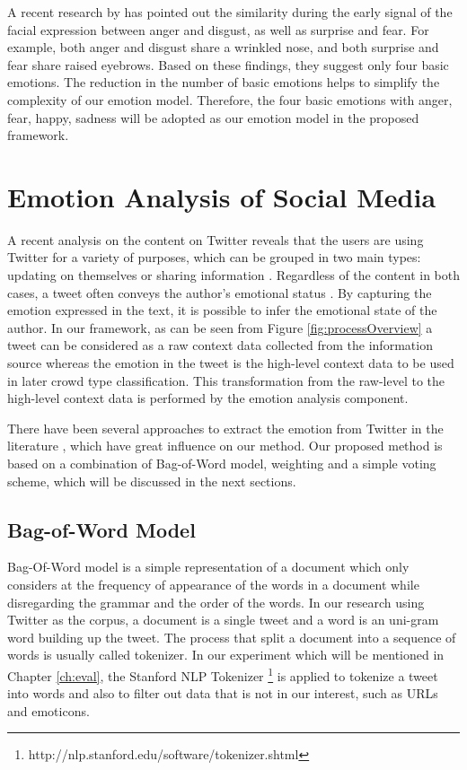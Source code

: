 A recent research by \cite{Jack2014} has pointed out the similarity during the early signal of the facial expression between anger and disgust, as well as surprise and fear. For example, both anger and disgust share a wrinkled nose, and both surprise and fear share raised eyebrows. Based on these findings, they suggest only four basic emotions. The reduction in the number of basic emotions helps to simplify the complexity of our emotion model. Therefore, the four basic emotions with anger, fear, happy, sadness will be adopted as our emotion model in the proposed framework.

\section{Emotion Analysis of Social Media}

A recent analysis on the content on Twitter reveals that the users are using Twitter for a variety of purposes, which can be grouped in two main types: updating on themselves or sharing information \citep{java2007we}. Regardless of the content in both cases, a tweet often conveys the author's emotional status \citep{bollen2009modeling}. By capturing the emotion expressed in the text, it is possible to infer the emotional state of the author. In our framework, as can be seen from Figure \ref{fig:processOverview} a tweet can be considered as a raw context data collected from the information source whereas the emotion in the tweet is the high-level context data to be used in later crowd type classification. This transformation from the raw-level to the high-level context data is performed by the emotion analysis component.

There have been several approaches to extract the emotion from Twitter in the literature \citep{roberts2012empatweet, bollen2009modeling, mohammad2012emotional, mohammad2014using}, which have great influence on our method. Our proposed method is based on a combination of Bag-of-Word model, weighting and a simple voting scheme, which will be discussed in the next sections.

\subsection{Bag-of-Word Model}
Bag-Of-Word model is a simple representation of a document which only considers at the frequency of appearance of the words in a document while disregarding the grammar and the order of the words. In our research using Twitter as the corpus, a document is a single tweet and a word is an uni-gram word building up the tweet. The process that split a document into a sequence of words is usually called tokenizer. In our experiment which will be mentioned in Chapter \ref{ch:eval}, the Stanford NLP Tokenizer \footnote{http://nlp.stanford.edu/software/tokenizer.shtml} is applied to tokenize a tweet into words and also to filter out data that is not in our interest, such as URLs and emoticons. 

